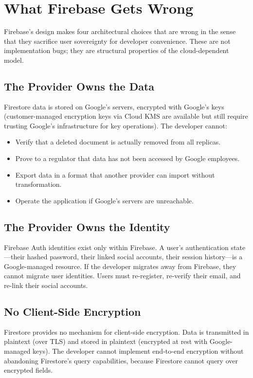 \section{What Firebase Gets Wrong}
\label{sec:wrong}

Firebase's design makes four architectural choices that are wrong in
the sense that they sacrifice user sovereignty for developer convenience.
These are not implementation bugs; they are structural properties of
the cloud-dependent model.

\subsection{The Provider Owns the Data}

Firestore data is stored on Google's servers, encrypted with Google's
keys (customer-managed encryption keys via Cloud KMS are available but
still require trusting Google's infrastructure for key operations). The
developer cannot:

\begin{itemize}
    \item Verify that a deleted document is actually removed from all replicas.
    \item Prove to a regulator that data has not been accessed by Google employees.
    \item Export data in a format that another provider can import without transformation.
    \item Operate the application if Google's servers are unreachable.
\end{itemize}

\subsection{The Provider Owns the Identity}

Firebase Auth identities exist only within Firebase. A user's
authentication state---their hashed password, their linked social
accounts, their session history---is a Google-managed resource. If the
developer migrates away from Firebase, they cannot migrate user identities.
Users must re-register, re-verify their email, and re-link their social
accounts.

\subsection{No Client-Side Encryption}

Firestore provides no mechanism for client-side encryption. Data is
transmitted in plaintext (over TLS) and stored in plaintext (encrypted
at rest with Google-managed keys). The developer cannot implement
end-to-end encryption without abandoning Firestore's query capabilities,
because Firestore cannot query over encrypted fields.

